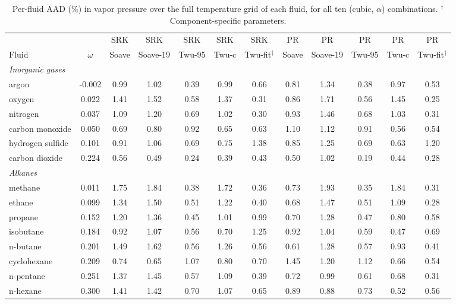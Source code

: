 \begin{table}[H]
\centering
\caption{Per-fluid AAD (\%) in vapor pressure over the full temperature grid of each fluid, for all ten (cubic, $\alpha$) combinations. $^{\dagger}$Component-specific parameters.}
\label{tab:tabS_perfluid_psat}
\small
\begin{tabular}{lccccccccccc}
\toprule
 &  & SRK & SRK & SRK & SRK & SRK & PR & PR & PR & PR & PR \\
Fluid & $\omega$ & Soave & Soave-19 & Twu-95 & Twu-c & Twu-fit$^{\dagger}$ & Soave & Soave-19 & Twu-95 & Twu-c & Twu-fit$^{\dagger}$ \\
\midrule
\multicolumn{15}{l}{\emph{Inorganic gases}} \\
argon & -0.002 & 0.99 & 1.02 & 0.39 & 0.99 & 0.66 & 0.81 & 1.34 & 0.38 & 0.97 & 0.53 \\
oxygen & 0.022 & 1.41 & 1.52 & 0.58 & 1.37 & 0.31 & 0.86 & 1.71 & 0.56 & 1.45 & 0.25 \\
nitrogen & 0.037 & 1.09 & 1.20 & 0.69 & 1.02 & 0.30 & 0.93 & 1.46 & 0.68 & 1.03 & 0.31 \\
carbon monoxide & 0.050 & 0.69 & 0.80 & 0.92 & 0.65 & 0.63 & 1.10 & 1.12 & 0.91 & 0.56 & 0.54 \\
hydrogen sulfide & 0.101 & 0.91 & 1.06 & 0.69 & 0.75 & 1.38 & 0.85 & 1.25 & 0.69 & 0.63 & 1.20 \\
carbon dioxide & 0.224 & 0.56 & 0.49 & 0.24 & 0.39 & 0.43 & 0.50 & 1.02 & 0.19 & 0.44 & 0.28 \\
\multicolumn{15}{l}{\emph{Alkanes}} \\
methane & 0.011 & 1.75 & 1.84 & 0.38 & 1.72 & 0.36 & 0.73 & 1.93 & 0.35 & 1.84 & 0.31 \\
ethane & 0.099 & 1.34 & 1.50 & 0.51 & 1.22 & 0.40 & 0.68 & 1.47 & 0.51 & 1.09 & 0.28 \\
propane & 0.152 & 1.20 & 1.36 & 0.45 & 1.01 & 0.99 & 0.70 & 1.28 & 0.47 & 0.80 & 0.58 \\
isobutane & 0.184 & 0.92 & 1.07 & 0.56 & 0.70 & 1.25 & 0.92 & 1.04 & 0.59 & 0.47 & 0.69 \\
n-butane & 0.201 & 1.49 & 1.62 & 0.56 & 1.26 & 0.56 & 0.61 & 1.28 & 0.57 & 0.93 & 0.41 \\
cyclohexane & 0.209 & 0.74 & 0.65 & 1.07 & 0.80 & 0.70 & 1.45 & 1.20 & 1.12 & 0.66 & 0.54 \\
n-pentane & 0.251 & 1.37 & 1.45 & 0.57 & 1.09 & 0.39 & 0.72 & 0.99 & 0.61 & 0.68 & 0.31 \\
n-hexane & 0.300 & 1.41 & 1.42 & 0.70 & 1.07 & 0.65 & 0.89 & 0.88 & 0.73 & 0.52 & 0.56 \\

\end{tabular}
\end{table}
